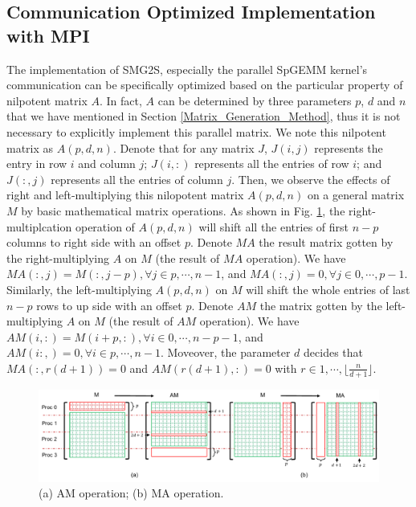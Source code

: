 \subsection{Communication Optimized Implementation with MPI}

The implementation of SMG2S, especially the parallel SpGEMM kernel's communication can be specifically optimized based on the particular property of nilpotent matrix $A$. In fact, $A$ can be determined by three parameters $p$, $d$ and $n$ that we have mentioned in Section \ref{Matrix_Generation_Method}, thus it is not necessary to explicitly implement this parallel matrix. We note this nilpotent matrix as $A(p,d,n)$. Denote that for any matrix $J$, $J(i,j)$ represents the entry in row $i$ and column $j$; $J(i,:)$ represents all the entries of row $i$; and $J(:,j)$ represents all the entries of column $j$. Then, we observe the effects of right and left-multiplying this nilopotent matrix $A(p,d,n)$ on a general matrix $M$ by basic mathematical matrix operations. As shown in Fig. \ref{fig:am}, the right-multiplcation operation of $A(p,d,n)$ will shift all the entries of first $n-p$ columns to right side with an offset $p$. Denote $MA$ the result matrix gotten by the right-multiplying $A$ on $M$ (the result of $MA$ operation). We have $MA(:,j)=M(:,j-p), \forall j \in p,\cdots, n-1$, and $MA(:,j)=0,  \forall j \in 0,\cdots, p-1$. Similarly, the left-multiplying $A(p,d,n)$ on $M$ will shift the whole entries of last $n-p$ rows to up side with an offset $p$. Denote $AM$ the matrix gotten by the left-multiplying $A$ on $M$ (the result of $AM$ operation). We have $AM(i,:)=M(i+p,:), \forall i \in 0,\cdots, n-p-1$, and $AM(i:,)=0,  \forall i \in p,\cdots, n-1$. Moveover, the parameter $d$ decides that $MA(:,r(d+1))=0$ and $AM(r(d+1),:)=0$ with $r \in 1, \cdots, \lfloor \frac{n}{d+1}\rfloor$. 

\begin{figure}[htbp]
	\centering
	\includegraphics[width=6.2in]{fig/AMMA_2.pdf}
	\caption{(a) AM operation; (b) MA operation.}
	\label{fig:am}
\end{figure}

